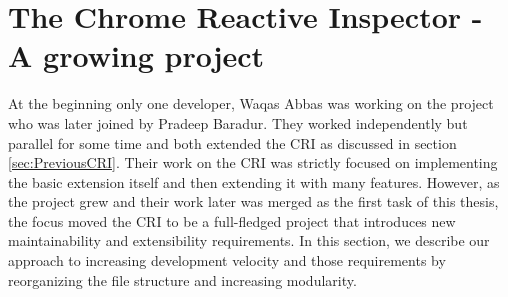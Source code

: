 \section{The Chrome Reactive Inspector - A growing project}
At the beginning only one developer, Waqas Abbas was working on the project who was later joined by Pradeep Baradur. They worked independently but parallel for some time and both extended the CRI as discussed in section \ref{sec:PreviousCRI}. Their work on the CRI was strictly focused on implementing the basic extension itself and then extending it with many features. However, as the project grew and their work later was merged as the first task of this thesis, the focus moved the CRI to be a full-fledged project that introduces new maintainability and extensibility requirements. In this section, we describe our approach to increasing development velocity and those requirements by reorganizing the file structure and increasing modularity.

